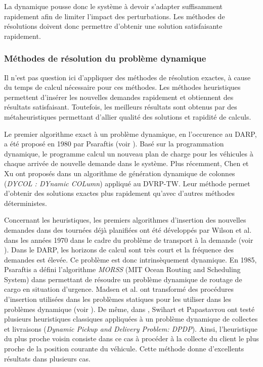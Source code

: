 La dynamique pousse donc le système à devoir s'adapter suffisamment rapidement afin de limiter l'impact des perturbations. Les méthodes de résolutions doivent donc permettre d'obtenir une solution satisfaisante rapidement.

\subsubsection{Méthodes de résolution du problème dynamique}

Il n'est pas question ici d'appliquer des méthodes de résolution exactes, à cause du temps de calcul nécessaire pour ces méthodes. Les méthodes heuristiques permettent d'insérer les nouvelles demandes rapidement et obtiennent des résultats satisfaisant. Toutefois, les meilleurs résultats sont obtenus par des métaheuristiques permettant d'allier qualité des solutions et rapidité de calculs.

Le premier algorithme exact à un problème dynamique, en l'occurence au DARP, a été proposé en 1980 par Psaraftis (voir \cite{Psaraftis1980}). Basé sur la programmation dynamique, le programme calcul un nouveau plan de charge pour les véhicules à chaque arrivée de nouvelle demande dans le système. Plus récemment, Chen et Xu ont proposés dans \cite{Chen2006} un algorithme de génération dynamique de colonnes (\textit{DYCOL : DYnamic COLumn}) appliqué au DVRP-TW. Leur méthode permet d'obtenir des solutions exactes plus rapidement qu'avec d'autres méthodes déterministes.

Concernant les heuristiques, les premiers algorithmes d'insertion des nouvelles demandes dans des tournées déjà planifiées ont été développés par Wilson et al. dans les années 1970 dans le cadre du problème de transport à la demande (voir \cite{Wilson1971,Wilson1975,Wilson1977}). Dans le DARP, les horizons de calcul sont très court et la fréquence des demandes est élevée. Ce problème est donc intrinsèquement dynamique. En 1985, Psaraftis a défini l'algorithme \textit{MORSS} (MIT Ocean Routing and Scheduling System) dans \cite{Psaraftis1985} permettant de résoudre un problème dynamique de routage de cargo en situation d'urgence.
Madsen et al. ont transformé des procédures d'insertion utilisées dans les problèmes statiques pour les utiliser dans les problèmes dynamique (voir \cite{Madsen1995}). De même, dans \cite{Swihart1999}, Swihart et Papastavrou ont testé plusieurs heuristiques classiques appliquées à un problème dynamique de collectes et livraisons (\textit{Dynamic Pickup and Delivery Problem: DPDP}). Ainsi, l'heuristique du plus proche voisin consiste dans ce cas à procéder à la collecte du client le plus proche de la position courante du véhicule. Cette méthode donne d'excellents résultats dans plusieurs cas.

